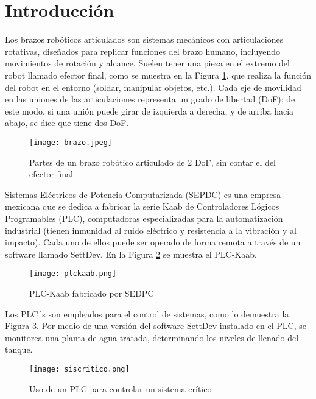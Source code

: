 \section{Introducci\'on}

Los brazos robóticos articulados son sistemas mecánicos con articulaciones rotativas, diseñados para replicar funciones del brazo humano, incluyendo movimientos de rotación y alcance. Suelen tener una pieza en el extremo del robot llamado efector final, como se muestra en la Figura \ref{fig:brazoR}, que realiza la función del robot en el entorno (soldar, manipular objetos, etc.). Cada eje de movilidad en las uniones de las articulaciones representa un grado de libertad (DoF); de este modo, si una unión puede girar de izquierda a derecha, y de arriba hacia abajo, se dice que tiene dos DoF.

\vspace{1cm}

\begin{figure}[htb]
	\centering
	\texttt{[image: brazo.jpeg]}
	\caption{Partes de un brazo robótico articulado de 2 DoF, sin contar el del efector final}
	\label{fig:brazoR}
\end{figure}

\newpage
Sistemas Eléctricos de Potencia Computarizada (SEPDC) es una empresa mexicana que se dedica a fabricar la serie Kaab de Controladores Lógicos Programables (PLC), computadoras especializadas para la automatización industrial (tienen inmunidad al ruido eléctrico y resistencia a la vibración y al impacto). Cada uno de ellos puede ser operado de forma remota a través de un software llamado SettDev. En la Figura \ref{fig:plc} se muestra el PLC-Kaab.

\begin{figure}[htb]
	\centering
	\texttt{[image: plckaab.png]}
	\caption{PLC-Kaab fabricado por SEDPC}
	\label{fig:plc}
\end{figure}

Los PLC´s son empleados para el control de sistemas, como lo demuestra la Figura \ref{fig:siscritico}. Por medio de una versión del software SettDev instalado en el PLC, se monitorea una planta de agua tratada, determinando los niveles de llenado del tanque.

\begin{figure}[htb]
	\centering
	\texttt{[image: siscritico.png]}
	\caption{Uso de un PLC para controlar un sistema crítico}
	\label{fig:siscritico}
\end{figure}